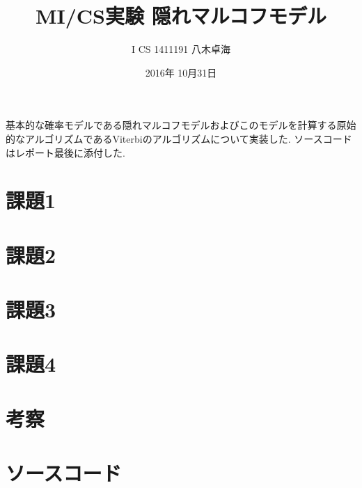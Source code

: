 \documentclass[a4paper]{jarticle}
\title{MI/CS実験 隠れマルコフモデル}
\author{I CS 1411191 八木卓海}
\date{2016年 10月31日}
\begin{document}
\maketitle
基本的な確率モデルである隠れマルコフモデルおよびこのモデルを計算する原始的なアルゴリズムであるViterbiのアルゴリズムについて実装した. ソースコードはレポート最後に添付した.
\section{課題1}
\section{課題2}
\section{課題3}
\section{課題4}
\section{考察}
\section{ソースコード}
%
\end{document}
